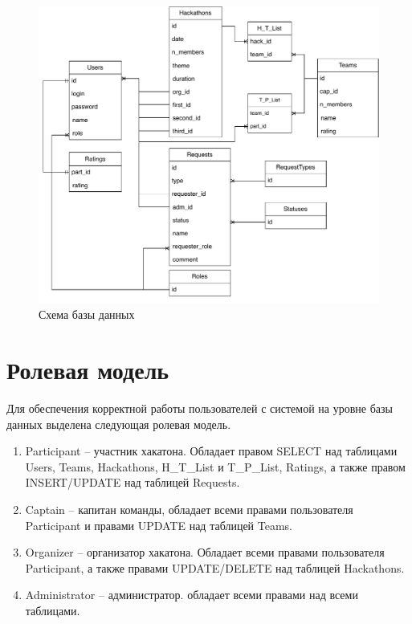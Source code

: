 \begin{figure}[H]
	\begin{center}
		\includegraphics[page=1,scale=0.8]{assets/db_er.drawio.pdf}
	\end{center}
	\caption{Схема базы данных}
	\label{er}
\end{figure}

\section{Ролевая модель}

Для обеспечения корректной работы пользователей с системой на уровне базы данных выделена следующая ролевая модель.

\begin{enumerate}
	\item Participant -- участник хакатона. Обладает правом SELECT над таблицами Users, Teams, Hackathons, H\_T\_List и T\_P\_List, Ratings, а также правом INSERT/UPDATE  над таблицей Requests.
        \item Captain -- капитан команды, обладает всеми правами пользователя \newline
        Participant и правами UPDATE над таблицей Teams.
        \item Organizer -- организатор хакатона. Обладает всеми правами пользователя Participant, а также правами UPDATE/DELETE над таблицей Hackathons.
	\item Administrator -- администратор. обладает всеми правами над всеми таблицами.
 
\end{enumerate}

